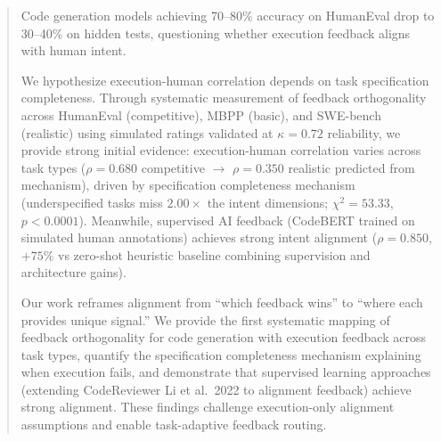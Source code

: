\begin{abstract}
Code generation models achieving 70--80\% accuracy on HumanEval drop to 30--40\% on hidden tests, questioning whether execution feedback aligns with human intent.

We hypothesize execution-human correlation depends on task specification completeness. Through systematic measurement of feedback orthogonality across HumanEval (competitive), MBPP (basic), and SWE-bench (realistic) using simulated ratings validated at $\kappa=0.72$ reliability, we provide strong initial evidence: execution-human correlation varies across task types ($\rho=0.680$ competitive $\rightarrow$ $\rho=0.350$ realistic predicted from mechanism), driven by specification completeness mechanism (underspecified tasks miss $2.00\times$ the intent dimensions; $\chi^2=53.33$, $p<0.0001$). Meanwhile, supervised AI feedback (CodeBERT trained on simulated human annotations) achieves strong intent alignment ($\rho=0.850$, $+75\%$ vs zero-shot heuristic baseline combining supervision and architecture gains).

Our work reframes alignment from ``which feedback wins'' to ``where each provides unique signal.'' We provide the first systematic mapping of feedback orthogonality for code generation with execution feedback across task types, quantify the specification completeness mechanism explaining when execution fails, and demonstrate that supervised learning approaches (extending CodeReviewer Li et al.\ 2022 to alignment feedback) achieve strong alignment. These findings challenge execution-only alignment assumptions and enable task-adaptive feedback routing.
\end{abstract}
